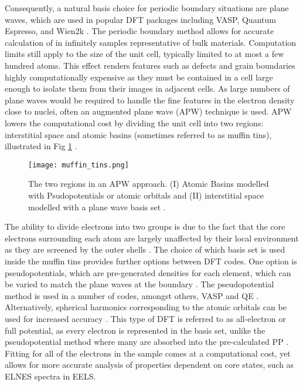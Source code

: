 Consequently, a natural basis choice for periodic boundary situations are plane waves, which are used in popular DFT packages including VASP, Quantum Espresso, and Wien2k \cite{qe,vasp,wien2k}.  The periodic boundary method allows for accurate calculation of in infinitely samples representative of bulk materials.  Computation limits still apply to the size of the unit cell, typically limited to at most a few hundred atoms.  This effect renders features such as defects and grain boundaries highly computationally expensive as they must be contained in a cell large enough to isolate them from their images in adjacent cells. 
As large numbers of plane waves would be required to handle the fine features in the electron density close to nuclei, often an augmented plane wave (APW) technique is used.  APW lowers the computational cost by dividing the unit cell into two regions: interstitial space and atomic basins (sometimes referred to as muffin tins), illustrated in Fig \ref{MT} \cite{wien2k}. 
\begin{figure}
	\centering
	\texttt{[image: muffin\_tins.png]}
	\caption{The two regions in an APW approach.  (I) Atomic Basins modelled with Psudopotentials or atomic orbitals and (II) interstitial space modelled with a plane wave basis set \cite{wien2k}. }
	\label{MT}   
\end{figure}

The ability to divide electrons into two groups is due to the fact that the core electrons surrounding each atom are largely unaffected by their local environment as they are screened by the outer shells \cite{wien2k}. The choice of which basis set is used inside the muffin tins provides further options between DFT codes.  One option is pseudopotentials, which are pre-generated densities for each element, which can be varied to match the plane waves at the boundary \cite{singh_planewaves_2006}.  The pseudopotential method is used in a number of codes, amongst others, VASP and QE \cite{vasp,qe}.  Alternatively, spherical harmonics corresponding to the atomic orbitals can be used for increased accuracy \cite{griffiths}. This type of DFT is referred to as all-electron or full potential, as every electron is represented in the basis set, unlike the pseudopotential method where many are absorbed into the pre-calculated PP \cite{wien2k}. Fitting for all of the electrons in the sample comes at a computational cost, yet allows for more accurate analysis of properties dependent on core states, such as ELNES spectra in EELS.   
 

